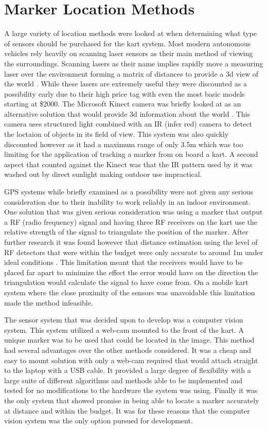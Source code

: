 \section{Marker Location Methods}

A large variety of location methods were looked at when determining what type of sensors should be purchased for the kart system. Most modern autonomous vehicles rely heavily on scanning laser sensors as their main method of viewing the surroundings. Scanning lasers as their name implies rapidly move a measuring laser over the environment forming a matrix of distances to provide a 3d view of the world \cite{laser}. While these lasers are extremely useful they were discounted as a possibility early due to their high price tag with even the most basic models starting at \$2000. The Microsoft Kinect camera was briefly looked at as an alternative solution that would provide 3d information about the world \cite{kinect}. This camera uses structured light combined with an IR (infer red) camera to detect the loctaion of objects in its field of view. This system was also quickly discounted however as it had a maximum range of only 3.5m which was too limiting for the application of tracking a marker from on board a kart. A second aspect that counted against the Kinect was that the IR pattern used by it was washed out by direct sunlight making outdoor use impractical.

GPS systems while briefly examined as a possibility were not given any serious consideration due to their inability to work reliably in an indoor environment. One solution that was given serious consideration was using a marker that output a RF (radio frequency) signal and having three RF receivers on the kart use the  relative strength of the signal to triangulate the position of the marker. After further research it was found however that distance estimation using the level of RF detectors that were within the budget were only accurate to around 1m under ideal conditions \cite{rf}. This limitation meant that the receivers would have to be placed far apart to minimize the effect the error would have on the direction the triangulation would calculate the signal to have come from. On a mobile kart system where the close proximity of the sensors was unavoidable this limitation made the method infeasible.

The sensor system that was decided upon to develop was a computer vision system. This system utilized a web-cam mounted to the front of the kart. A unique marker was to be used that could be located in the image. This method had several advantages over the other methods considered. It was a cheap and easy to mount solution with only a web-cam required that would attach straight to the laptop with a USB cable. It provided a large degree of flexibility with a large suite of different algorithms and methods able to be implemented and tested for no modifications to the hardware the system was using. Finally it was the only system that showed promise in being able to locate a marker accurately at distance and within the budget. It was for these reasons that the computer vision system was the only option pursued for development.